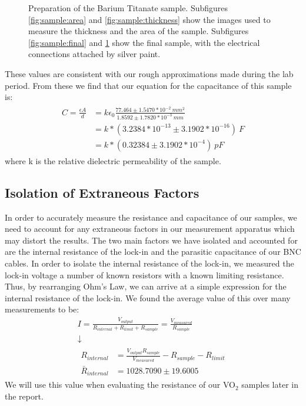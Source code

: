 \documentclass[%
 reprint,
 amsmath,amssymb,
 aps,
 pra,
]{revtex4-1}
\begin{document}
\begin{figure}[H]
\begin{subfigure}{0.22\textwidth}
		\caption{}
		\label{fig:sample:inplace}
	\end{subfigure}
	\caption{Preparation of the Barium Titanate sample. Subfigures \ref{fig:sample:area} and \ref{fig:sample:thickness} show the images used to measure the thickness and the area of the sample. Subfigures \ref{fig:sample:final} and \ref{fig:sample:inplace} show the final sample, with the electrical connections attached by silver paint.}
	\label{fig:sample}
\end{figure}

These values are consistent with our rough approximations made during the lab period. From these we find that our equation for the capacitance of this sample is:
\begin{gather}
	\begin{align}
		C = \frac{\epsilon A}{d} & = k \epsilon_0 \frac{77.464 \pm 1.5470*10^{-2} ~mm^2}{1.8592 \pm 1.7820*10^{-3} ~mm} \nonumber \\
		& = k*(3.2384*10^{-13} \pm 3.1902*10^{-16})~F \nonumber \\
		& = k*(0.32384 \pm 3.1902*10^{-4})~pF \nonumber
	\end{align}
\end{gather}
where k is the relative dielectric permeability of the sample. 


\subsection{Isolation of Extraneous Factors}\label{section:factors}

In order to accurately measure the resistance and capacitance of our samples, we need to account for any extraneous factors in our measurement apparatus which may distort the results. The two main factors we have isolated and accounted for are the internal resistance of the lock-in and the parasitic capacitance of our BNC cables. In order to isolate the internal resistance of the lock-in, we measured the lock-in voltage a number of known resistors with a known limiting resistance. Thus, by rearranging Ohm's Law, we can arrive at a simple expression for the internal resistance of the lock-in. We found the average value of this over many measurements to be:
\begin{gather}
	I = \frac{V_{output}}{R_{internal} + R_{limit} + R_{sample}} = \frac{V_{measured}}{R_{sample}} \nonumber \\
	\downarrow \nonumber \\
	\begin{align}
		R_{internal} 		& = \frac{V_{output}R_{sample}}{V_{measured}} - R_{sample} - R_{limit} \nonumber \\
		\bar{R}_{internal} 	& = 1028.7090 \pm 19.6005 \nonumber
	\end{align}
\end{gather}
We will use this value when evaluating the resistance of our VO$_2$ samples later in the report.
\end{document}
